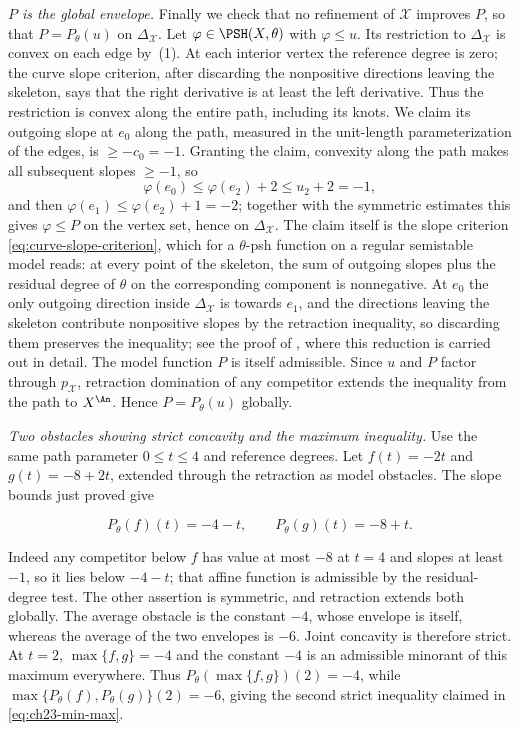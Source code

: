\begin{example}
\emph{$P$ is the global envelope.}  Finally we check that no refinement of
$\mathcal X$ improves $P$, so that $P=P_\theta(u)$ on
$\Delta_{\mathcal X}$.  Let $\varphi\in\PSH(X,\theta)$ with
$\varphi\leq u$.  Its restriction to $\Delta_{\mathcal X}$ is convex on
each edge by \,(1).  At each
interior vertex the reference degree is zero; the curve slope criterion,
after discarding the nonpositive directions leaving the skeleton, says
that the right derivative is at least the left derivative.  Thus the
restriction is convex along the entire path, including its knots.  We claim its
outgoing slope at $e_0$ along the path, measured in the unit-length
parameterization of the edges, is $\geq-c_0=-1$.  Granting the claim,
convexity along the path makes all subsequent slopes $\geq-1$, so
\[
 \varphi(e_0)\leq\varphi(e_2)+2\leq u_2+2=-1,
\]
and then $\varphi(e_1)\leq\varphi(e_2)+1=-2$; together with the symmetric
estimates this gives $\varphi\leq P$ on the vertex set, hence on
$\Delta_{\mathcal X}$.  The claim itself is the slope criterion
\eqref{eq:curve-slope-criterion}, which for a $\theta$-psh function on a
regular semistable model reads: at every point of the skeleton, the sum of
outgoing slopes plus the residual degree of $\theta$ on the corresponding
component is nonnegative.  At $e_0$ the only outgoing direction inside
$\Delta_{\mathcal X}$ is towards $e_1$, and the directions leaving the
skeleton contribute nonpositive slopes by the retraction inequality, so
discarding them preserves the inequality; see the proof of
, where this reduction is
carried out in detail.  The model function $P$ is itself admissible.
Since $u$ and $P$ factor through $p_{\mathcal X}$, retraction domination
of any competitor extends the inequality from the path to $X^{\An}$.
Hence $P=P_\theta(u)$ globally.

\emph{Two obstacles showing strict concavity and the maximum inequality.}
Use the same path parameter $0\leq t\leq4$ and reference degrees.
Let $f(t)=-2t$ and $g(t)=-8+2t$, extended through the retraction as model
obstacles.  The slope bounds just proved give

\[
 P_\theta(f)(t)=-4-t,\qquad P_\theta(g)(t)=-8+t.
\]

Indeed any competitor below $f$ has value at most $-8$ at $t=4$ and
slopes at least $-1$, so it lies below $-4-t$; that affine function is
admissible by the residual-degree test.  The other assertion is symmetric,
and retraction extends both globally.  The average obstacle is the
constant $-4$, whose envelope is itself, whereas the average of the two
envelopes is $-6$.  Joint concavity is therefore strict.  At $t=2$,
$\max\{f,g\}=-4$ and the constant $-4$ is an admissible minorant of
this maximum everywhere.  Thus
$P_\theta(\max\{f,g\})(2)=-4$, while
$\max\{P_\theta(f),P_\theta(g)\}(2)=-6$, giving the second strict
inequality claimed in \eqref{eq:ch23-min-max}.
\end{example}


